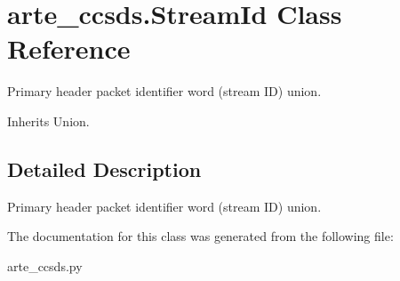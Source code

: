\section{arte\+\_\+ccsds.\+Stream\+Id Class Reference}
\label{classarte__ccsds_1_1_stream_id}


Primary header packet identifier word (stream ID) union.  




Inherits Union.



\subsection{Detailed Description}
Primary header packet identifier word (stream ID) union. 



The documentation for this class was generated from the following file\+:\begin{DoxyCompactItemize}
\item 
arte\+\_\+ccsds.\+py\end{DoxyCompactItemize}
